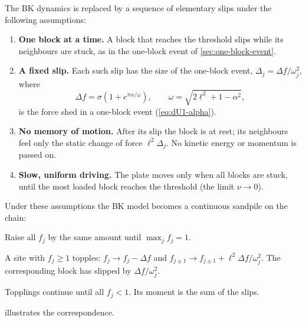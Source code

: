 The BK dynamics is replaced by a sequence of elementary slips under the following assumptions:
\begin{enumerate}[label=(A\arabic*)]
  \item \textbf{One block at a time.} A block that reaches the threshold slips while its neighbours are stuck, as in the one-block
    event of \cref{sec:one-block-event}.
  \item \textbf{A fixed slip.} Each such slip has the size of the one-block event, $\Delta_j = \Delta f/\omega_j^2$, where
    \begin{equation}
      \Delta f = \sigma\left(1+e^{\pi\alpha/\omega}\right),\qquad \omega = \sqrt{2\ell^2+1-\alpha^2},
      \label{eq:map-drop}
    \end{equation}
    is the force shed in a one-block event (\cref{eq:dU1-alpha}).
  \item \textbf{No memory of motion.} After its slip the block is at rest; its neighbours feel only the static change of force
    $\ell^2\Delta_j$. No kinetic energy or momentum is passed on.
  \item \textbf{Slow, uniform driving.} The plate moves only when all blocks are stuck, until the most loaded block reaches the threshold
    (the limit $\nu\to0$).
\end{enumerate}
Under these assumptions the BK model becomes a continuous sandpile on the chain:
\begin{description}[font=\normalfont\itshape]
  \item[Drive.] Raise all $f_j$ by the same amount until $\max_j f_j = 1$.
  \item[Toppling.] A site with $f_j\ge1$ topples: $f_j\to f_j - \Delta f$ and $f_{j\pm1}\to f_{j\pm1} + \ell^2\Delta f/\omega_j^2$. The
    corresponding block has slipped by $\Delta f/\omega_j^2$.
  \item[Avalanche.] Topplings continue until all $f_j<1$. Its moment is the sum of the slips.
\end{description}
 illustrates the correspondence.

